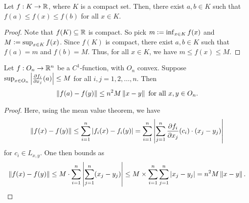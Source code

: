 \begin{theorem}
    Let $f:K \to \mathbb{R}$, where $K$ is a compact set. Then, there exist $a,b \in K$ such that $f(a) \leq f(x) \leq f(b)$ for all $x \in K$.
\end{theorem}
\begin{proof}
    Note that $f(K) \subseteq \mathbb{R}$ is compact. So pick $m \vcentcolon= \inf_{x \in K} f(x)$ and $M \vcentcolon= \sup_{x \in K} f(x)$. Since $f(K)$ is compact, there exist $a,b \in K$ such that $f(a) = m$ and $f(b) = M$. Thus, for all $x \in K$, we have $m \leq f(x) \leq M$.
\end{proof}

\begin{lemma}
    Let $f:O_{n} \to \mathbb{R}^{n}$ be a $C^{1}$-function, with $O_{n}$ convex. Suppose $\sup_{x \in O_{n}} \left| \frac{\partial f_{i}}{\partial x_{j}}(a) \right| \leq M$ for all $i,j = 1,2,\ldots,n$. Then
    \begin{align}
        \left\lVert f(a)-f(y)\right\rVert \leq n^{2}M \left\lVert x-y\right\rVert \text{ for all } x,y \in O_{n}.
    \end{align}
\end{lemma}
\begin{proof}
    Here, using the mean value theorem, we have
    \begin{align}
        \left\lVert f(x)-f(y)\right\rVert \leq \sum_{i=1}^{n} \left| f_{i}(x)-f_{i}(y) \right| = \sum_{i=1}^{n} \left| \sum_{j=1}^{n}\frac{\partial f_{i}}{\partial x_{j}}(c_{i}) \cdot (x_{j}-y_{j}) \right|
    \end{align}
    for $c_{i} \in L_{x,y}$. One then bounds as
    \begin{align}
        \left\lVert f(x)-f(y)\right\rVert \leq M \cdot \sum_{i=1}^{n} \left| \sum_{j=1}^{n}(x_{j}-y_{j}) \right| \leq M \times \sum_{i=1}^{n} \sum_{j=1}^{n} \left| x_{j}-y_{j} \right| = n^{2}M \left\lVert x-y\right\rVert.
    \end{align}
\end{proof}

